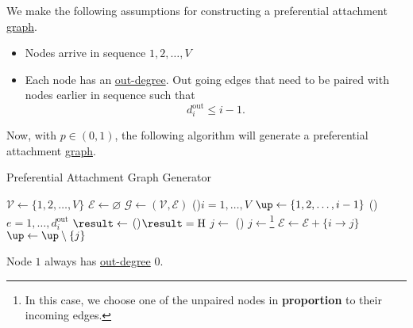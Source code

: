 We make the following assumptions for constructing a preferential attachment \hyperref[def:graph]{graph}.
\begin{itemize}
	\item Nodes arrive in sequence \(1, 2, \dots , V\)
	\item Each node has an \hyperref[def:out-degree]{out-degree}. Out going edges that need to be paired with nodes earlier in sequence such that
	      \[
		      d_{i}^{\text{out}} \leq i - 1.
	      \]
\end{itemize}

Now, with \(p\in(0, 1)\), the following algorithm will generate a preferential attachment \hyperref[def:graph]{graph}.

\begin{algorithm}[H]\label{algo:preferential-attachment-graph-generator-algo}
	\DontPrintSemicolon
	\caption{Preferential Attachment Graph Generator}
	\BlankLine

	\(\mathcal{V} \gets \{1, 2, \dots , V\}\)\;
	\(\mathcal{E} \gets \varnothing\)\;
	\(\mathcal{G} \gets (\mathcal{V} , \mathcal{E} )\) 
	\;
	\For(){\(i = 1, \dots  , V\)}{
	\(\up\gets \{1, 2, \dots , i-1 \}\)
	\For(){\(e = 1, \dots, d^{\text{out}}_i\)}{
	\(\result\gets\) 
	\uIf(){\(\result = \mathrm{H}\)}{
		\(j\gets\)\rand{\(\up\) }
	}\Else(){
	\(j\gets \)\footnote{In this case, we choose one of the unpaired nodes in \textbf{proportion} to their incoming edges.}\;
	}
	\;
	\(\mathcal{E} \gets \mathcal{E} + \{i \to j\}\)
	\(\up\gets \up \setminus \{j\}\)
	}
	}

	\;
\end{algorithm}

\begin{remark}
	Node \(1 \) always has \hyperref[def:out-degree]{out-degree} \(0\).
\end{remark}

